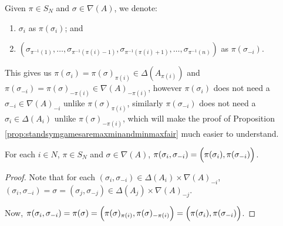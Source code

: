 Given $\pi \in S_N$ and $\sigma \in \nabla(A)$, we denote:
\begin{enumerate}
	\item $\sigma_i$ as $\pi(\sigma_i)$; and
	\item $(\sigma_{\pi^{-1}(1)}, \ldots, \sigma_{\pi^{-1}\left(\pi(i)-1\right)}, \sigma_{\pi^{-1}\left(\pi(i)+1\right)}, \ldots, \sigma_{\pi^{-1}(n)})$ as $\pi(\sigma_{-i})$.
\end{enumerate}
This gives us $\pi(\sigma_i) = \pi(\sigma)_{\pi(i)} \in \Delta(A_{\pi(i)})$ and $\pi(\sigma_{-i}) = \pi(\sigma)_{-\pi(i)} \in {\nabla(A)}_{-\pi(i)}$, however $\pi(\sigma_i)$ does not need a $\sigma_{-i} \in {\nabla(A)}_{-i}$ unlike $\pi(\sigma)_{\pi(i)}$, similarly $\pi(\sigma_{-i})$ does not need a $\sigma_i \in \Delta(A_i)$ unlike $\pi(\sigma)_{-\pi(i)}$, which will make the proof of Proposition \ref{prop:standsymgamesaremaxminandminmaxfair} much easier to understand.

\begin{proposition}
	For each $i \in N$, $\pi \in S_N$ and $\sigma \in \nabla(A)$, $\pi(\sigma_i, \sigma_{-i}) = \Bigl(\pi(\sigma_i), \pi(\sigma_{-i})\Bigr)$.
	
	\begin{proof}
		Note that for each $(\sigma_i, \sigma_{-i}) \in \Delta(A_i)\times{\nabla(A)}_{-i}$, $(\sigma_i, \sigma_{-i}) = \sigma = (\sigma_j, \sigma_{-j}) \in \Delta(A_j)\times{\nabla(A)}_{-j}$.
		
		Now, $\pi(\sigma_i, \sigma_{-i}) = \pi(\sigma) = \Bigl(\pi(\sigma)_{\pi(i)}, \pi(\sigma)_{-\pi(i)}\Bigr) = \Bigl(\pi(\sigma_i), \pi(\sigma_{-i})\Bigr)$.
	\end{proof}
\end{proposition}

